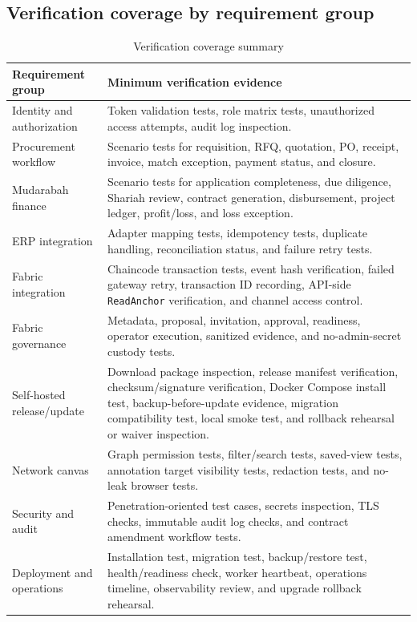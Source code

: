 \documentclass[11pt,a4paper]{article}
\newcommand{\code}[1]{\texttt{#1}}
\begin{document}
\subsection{Verification coverage by requirement group}
\begin{table}[h]
\centering
\begin{tabularx}{\textwidth}{@{}p{}X@{}}
\toprule
Requirement group & Minimum verification evidence \\
\midrule
Identity and authorization & Token validation tests, role matrix tests, unauthorized access attempts, audit log inspection. \\
Procurement workflow & Scenario tests for requisition, RFQ, quotation, PO, receipt, invoice, match exception, payment status, and closure. \\
Mudarabah finance & Scenario tests for application completeness, due diligence, Shariah review, contract generation, disbursement, project ledger, profit/loss, and loss exception. \\
ERP integration & Adapter mapping tests, idempotency tests, duplicate handling, reconciliation status, and failure retry tests. \\
Fabric integration & Chaincode transaction tests, event hash verification, failed gateway retry, transaction ID recording, API-side \code{ReadAnchor} verification, and channel access control. \\
Fabric governance & Metadata, proposal, invitation, approval, readiness, operator execution, sanitized evidence, and no-admin-secret custody tests. \\
Self-hosted release/update & Download package inspection, release manifest verification, checksum/signature verification, Docker Compose install test, backup-before-update evidence, migration compatibility test, local smoke test, and rollback rehearsal or waiver inspection. \\
Network canvas & Graph permission tests, filter/search tests, saved-view tests, annotation target visibility tests, redaction tests, and no-leak browser tests. \\
Security and audit & Penetration-oriented test cases, secrets inspection, TLS checks, immutable audit log checks, and contract amendment workflow tests. \\
Deployment and operations & Installation test, migration test, backup/restore test, health/readiness check, worker heartbeat, operations timeline, observability review, and upgrade rollback rehearsal. \\
\bottomrule
\end{tabularx}
\caption{Verification coverage summary}
\end{table}
\end{document}
